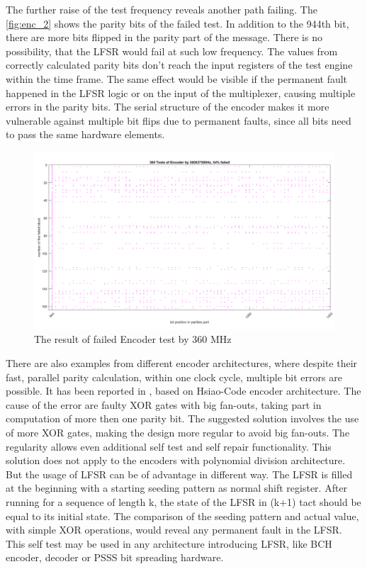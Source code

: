 The further raise of the test frequency reveals another path failing. The \autoref{fig:enc_2} shows the parity bits of the failed test. In addition to the 944th bit, there are more bits flipped in the parity part of the message. There is no possibility, that the LFSR would fail at such low frequency. The values from correctly calculated parity bits don't reach the input registers of the test engine within the time frame. The same effect would be visible if the permanent fault happened in the LFSR logic or on the input of the multiplexer, causing multiple errors in the parity bits. The serial structure of the encoder makes it more vulnerable against multiple bit flips due to permanent faults, since all bits need to pass the same hardware elements.

\begin{figure}[h]
\centering
\includegraphics[width=\textwidth]{figures/test_ENC_multiple.png}
\caption{The result of failed Encoder test by 360 MHz}
\label{fig:enc_2}
\end{figure}

There are also examples from different encoder architectures, where despite their fast, parallel parity calculation, within one clock cycle, multiple bit errors are possible. It has been reported in \cite{art:Dicorato}, based on Hsiao-Code encoder architecture. The cause of the error are faulty XOR gates with big fan-outs, taking part in computation of more then one parity bit. The suggested solution involves the use of more XOR gates, making the design more regular to avoid big fan-outs. The regularity allows even additional self test and self repair functionality. This solution does not apply to the encoders with polynomial division architecture. But the usage of LFSR can be of advantage in different way. The LFSR is filled at the beginning with a starting seeding pattern as normal shift register. After running for a sequence of length k, the state of the LFSR in (k+1) tact should be equal to its initial state. The comparison of the seeding pattern and actual value, with simple XOR operations, would reveal any permanent fault in the LFSR. This self test may be used in any architecture introducing LFSR, like BCH encoder, decoder or PSSS bit spreading hardware\cite{art:Gleichner}.

